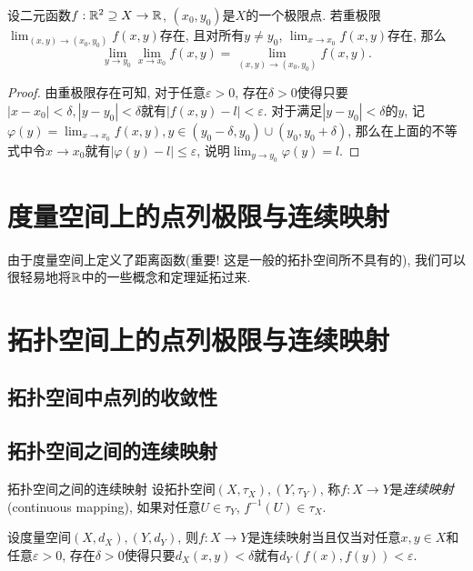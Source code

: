 \begin{proposition}{}
	设二元函数$f:\mathbb{R} ^2 \supseteq X \to \mathbb{R}$, $(x_0,y_0)$是$X$的一个极限点. 若重极限$\lim_{(x,y) \to (x_0,y_0)} f(x,y)$存在, 且对所有$y \neq y_0$, $\lim_{x \to x_0} f(x,y)$存在, 那么$$\lim_{y\to y_0} \lim_{x \to x_0} f(x,y) = \lim_{(x,y) \to (x_0,y_0)} f(x,y).$$
\end{proposition}
\begin{proof}
	由重极限存在可知, 对于任意$\varepsilon >0$, 存在$\delta >0$使得只要$|x-x_0|<\delta,|y-y_0|<\delta$就有$|f(x,y)-l|<\varepsilon$. 对于满足$|y-y_0|<\delta$的$y$, 记$\varphi (y) = \lim_{x \to x_0} f(x,y), y \in (y_0-\delta ,y_0) \cup (y_0,y_0 + \delta)$, 那么在上面的不等式中令$x \to x_0$就有$|\varphi (y) - l | \leq \varepsilon$, 说明$\lim_{y \to y_0} \varphi (y) = l$. 
\end{proof}

\newpage
\section{度量空间上的点列极限与连续映射}

由于度量空间上定义了距离函数(重要! 这是一般的拓扑空间所不具有的), 我们可以很轻易地将$\mathbb{R}$中的一些概念和定理延拓过来. 

\newpage
\section{拓扑空间上的点列极限与连续映射}




\subsection{拓扑空间中点列的收敛性}

\subsection{拓扑空间之间的连续映射}

\begin{definition}{拓扑空间之间的连续映射}
	设拓扑空间$(X,\tau _X),(Y,\tau _Y)$, 称$f: X \to Y$是\textit{连续映射}(continuous mapping), 如果对任意$U \in \tau _Y$, $f^{-1}(U) \in \tau _X$. 
\end{definition}

\begin{proposition}{}
	设度量空间$(X,d_X),(Y,d_Y)$, 则$f:X \to Y$是连续映射当且仅当对任意$x,y \in X$和任意$\varepsilon >0$, 存在$\delta >0$使得只要$d_X(x,y)<\delta$就有$d_Y(f(x),f(y))<\varepsilon$. 
\end{proposition}

